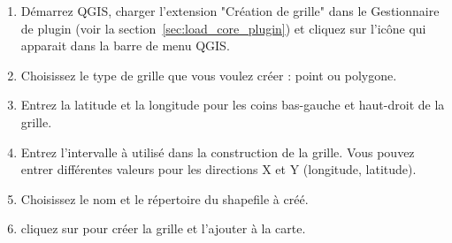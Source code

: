 \begin{enumerate}
\item D\'emarrez QGIS, charger l'extension "Cr\'eation de grille" dans le
Gestionnaire de plugin (voir la section~\ref{sec:load_core_plugin}) et cliquez
sur l'ic\^one   qui apparait dans la
barre de menu QGIS.
\item Choisissez le type de grille que vous voulez cr\'eer : point ou polygone.
\item Entrez la latitude et la longitude pour les coins bas-gauche et
haut-droit de la grille.
\item Entrez l'intervalle \`a utilis\'e dans la construction de la grille. Vous
pouvez entrer diff\'erentes valeurs pour les directions X et Y (longitude,
latitude).
\item Choisissez le nom et le r\'epertoire du shapefile \`a cr\'e\'e.
\item cliquez sur  pour cr\'eer la grille et l'ajouter \`a la carte.
\end{enumerate} 



